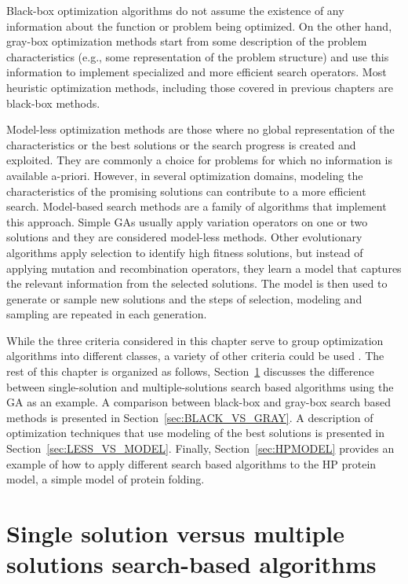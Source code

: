  Black-box optimization algorithms do not assume the existence of any information about the function or problem being optimized. On the other hand, gray-box optimization methods start from some description of the problem characteristics (e.g., some representation of the problem structure) and use this information to implement specialized and more efficient search operators. Most heuristic optimization methods, including those covered in previous chapters are black-box methods. 


 Model-less optimization methods are those where no global representation of the characteristics or the best solutions or the search progress is created and exploited. They are commonly a choice for problems for which no information is available a-priori. However, in several optimization domains, modeling the characteristics of the promising solutions can contribute to a more efficient search. Model-based search methods are a family of algorithms that implement this approach. Simple GAs  usually apply variation operators on one or two solutions and they are considered model-less methods.  Other evolutionary algorithms apply selection to identify high fitness solutions, but instead of applying mutation and recombination operators, they learn a model that captures the relevant information from the selected solutions. The model is then used to generate or sample new solutions and the steps of selection, modeling and sampling are repeated in each generation. 

 While the three criteria considered in this chapter serve to group optimization algorithms into different classes, a variety of other criteria could be used \cite{Stork_et_al:2020}. The rest of this chapter is organized as follows, Section~\ref{sec:SINGLE_VS_POP} discusses the difference between single-solution and multiple-solutions search based algorithms using the GA as an example.  A comparison between black-box and gray-box search based methods is presented in Section~\ref{sec:BLACK_VS_GRAY}. A description of optimization techniques that use modeling of the best solutions is presented in Section~\ref{sec:LESS_VS_MODEL}. Finally, Section~\ref{sec:HPMODEL} provides an example of how to apply different search based algorithms to the HP protein model, a simple model of protein folding. 


 \section{Single solution versus multiple solutions search-based algorithms} \label{sec:SINGLE_VS_POP}

